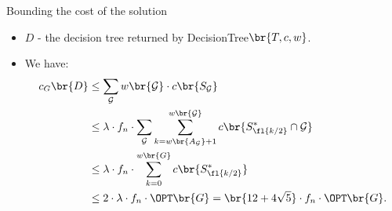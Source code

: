 \begin{frame}{Bounding the cost of the solution }
\begin{itemize}
    \item $D$ - the decision tree returned by DecisionTree$\br{T,c,w}$.
    \pause 
    \item We have:
    \begin{align*}
            c_G\br{D}&\leq \sum_{\mathcal{G}}w\br{\mathcal{G}}\cdot c\br{S_{\mathcal{G}}}\\
            &\leq \lambda \cdot f_n\cdot \sum_{\mathcal{G}}\sum_{k=w\br{A_{\mathcal{G}}}+1}^{w\br{\mathcal{G}}}c\br{S_{\fl{k/2}}^*\cap \mathcal{G}}
            \\&\leq 
            \lambda \cdot f_n\cdot\sum_{k=0}^{w\br{G}}c\br{S_{\fl{k/2}}^*} \\
            &\leq 2\cdot \lambda \cdot f_n\cdot \OPT\br{G} = \br{12+4\sqrt{5}}\cdot f_n \cdot \OPT\br{G}.
        \end{align*}
\end{itemize} 
\end{frame}



    



